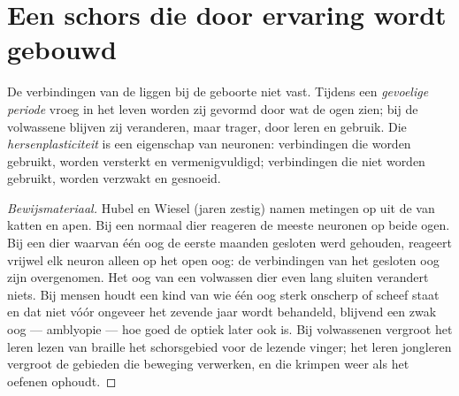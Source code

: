 \section{Een schors die door ervaring wordt gebouwd}

\begin{proposition}[Plasticiteit]\label{prop:g11:vision-and-brain:plasticity}
De verbindingen van de  liggen bij de geboorte niet vast.
Tijdens een \emph{gevoelige periode} vroeg in het leven worden zij gevormd
door wat de ogen zien; bij de volwassene blijven zij veranderen, maar
trager, door leren en gebruik. Die \emph{hersenplasticiteit}
is een eigenschap van neuronen: verbindingen die worden gebruikt, worden
versterkt en vermenigvuldigd; verbindingen die niet worden gebruikt,
worden verzwakt en gesnoeid.
\end{proposition}
\begin{proof}[Bewijsmateriaal]
Hubel en Wiesel (jaren zestig) namen metingen op uit de  van
katten en apen. Bij een normaal dier reageren de meeste neuronen op beide
ogen. Bij een dier waarvan één oog de eerste maanden gesloten werd
gehouden, reageert vrijwel elk neuron alleen op het open oog: de
verbindingen van het gesloten oog zijn overgenomen. Het oog van een
volwassen dier even lang sluiten verandert niets. Bij mensen houdt een
kind van wie één oog sterk onscherp of scheef staat en dat niet vóór
ongeveer het zevende jaar wordt behandeld, blijvend een zwak oog ---
amblyopie --- hoe goed de optiek later ook is. Bij volwassenen vergroot
het leren lezen van braille het schorsgebied voor de lezende vinger; het
leren jongleren vergroot de gebieden die beweging verwerken, en die
krimpen weer als het oefenen ophoudt.
\end{proof}

